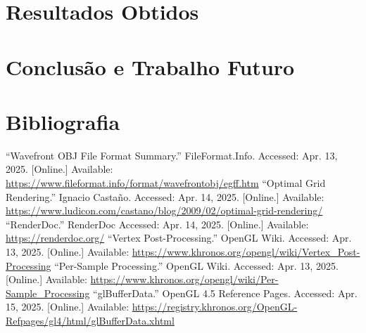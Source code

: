 \documentclass[12pt, a4paper]{article}
\begin{document}
\section{Resultados Obtidos}

\section{Conclusão e Trabalho Futuro}

\begingroup
\section{Bibliografia}
\renewcommand{\section}[2]{}

\begin{thebibliography}{9}
        ``Wavefront OBJ File Format Summary.'' FileFormat.Info. Accessed: Apr. 13, 2025. [Online.]
        Available: \url{https://www.fileformat.info/format/wavefrontobj/egff.htm}
        ``Optimal Grid Rendering.'' Ignacio Castaño. Accessed: Apr. 14, 2025. [Online.] Available:
        \url{https://www.ludicon.com/castano/blog/2009/02/optimal-grid-rendering/}
        ``RenderDoc.'' RenderDoc Accessed: Apr. 14, 2025. [Online.] Available:
        \url{https://renderdoc.org/}
        ``Vertex Post-Processing.'' OpenGL Wiki. Accessed: Apr. 13, 2025. [Online.] Available:
        \url{https://www.khronos.org/opengl/wiki/Vertex_Post-Processing}
        ``Per-Sample Processing.'' OpenGL Wiki. Accessed: Apr. 13, 2025. [Online.] Available:
        \url{https://www.khronos.org/opengl/wiki/Per-Sample_Processing}
        ``glBufferData.'' OpenGL 4.5 Reference Pages. Accessed: Apr. 15, 2025. [Online.] Available:
        \url{https://registry.khronos.org/OpenGL-Refpages/gl4/html/glBufferData.xhtml}
\end{thebibliography}
\endgroup
\end{document}
